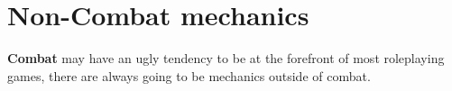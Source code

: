\chapter{Non-Combat mechanics}
\textbf{Combat} may have an ugly tendency to be at the forefront of most roleplaying games, there are always going to be mechanics outside of combat.

